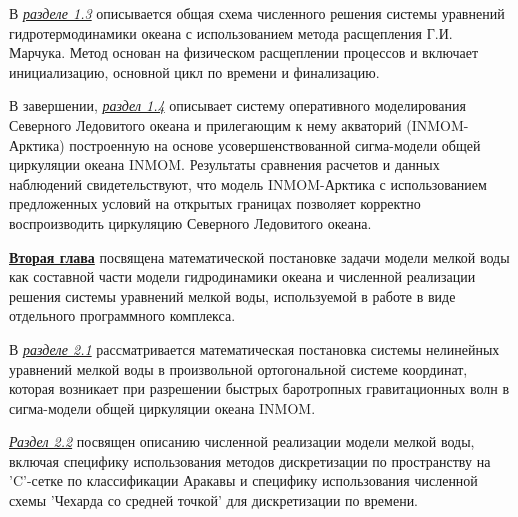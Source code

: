 В \underline{\textit{разделе 1.3}} описывается общая схема численного решения системы уравнений гидротермодинамики океана с использованием метода расщепления Г.И. Марчука. Метод основан на физическом расщеплении процессов и включает инициализацию, основной цикл по времени и финализацию.

В завершении, \underline{\textit{раздел 1.4}} описывает систему оперативного моделирования Северного Ледовитого океана и прилегающим к нему акваторий (INMOM-Арктика) построенную на основе усовершенствованной сигма-модели общей циркуляции океана INMOM.
Результаты сравнения расчетов и данных наблюдений свидетельствуют, что модель INMOM-Арктика с использованием предложенных условий на открытых границах позволяет корректно воспроизводить циркуляцию Северного Ледовитого океана.

\underline{\textbf{Вторая глава}} посвящена математической постановке задачи модели мелкой воды как составной части модели гидродинамики океана и численной реализации решения системы уравнений мелкой воды, используемой в работе в виде отдельного программного комплекса.

В \underline{\textit{разделе 2.1}} рассматривается математическая постановка системы нелинейных уравнений мелкой воды в произвольной ортогональной системе координат, которая возникает при разрешении быстрых баротропных гравитационных волн в сигма-модели общей циркуляции океана INMOM.

\underline{\textit{Раздел 2.2}} посвящен описанию численной реализации модели мелкой воды, включая специфику использования методов дискретизации по пространству на 'C'-сетке по классификации Аракавы и специфику использования численной схемы 'Чехарда со средней точкой' для дискретизации по времени.

